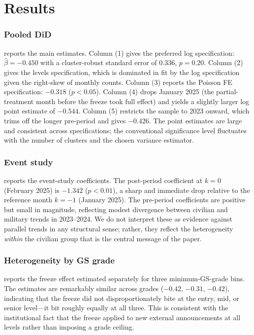 \documentclass[12pt]{article}
\begin{document}
\section{Results}
\label{sec:res}

\subsubsection*{Pooled DiD}  reports the main estimates. Column (1) gives the preferred log specification: $\hat\beta = -0.450$ with a cluster-robust standard error of $0.336$, $p = 0.20$. Column (2) gives the levels specification, which is dominated in fit by the log specification given the right-skew of monthly counts. Column (3) reports the Poisson FE specification: $-0.318$ ($p < 0.05$). Column (4) drops January 2025 (the partial-treatment month before the freeze took full effect) and yields a slightly larger log point estimate of $-0.544$. Column (5) restricts the sample to 2023 onward, which trims off the longer pre-period and gives $-0.426$. The point estimates are large and consistent across specifications; the conventional significance level fluctuates with the number of clusters and the chosen variance estimator.



\subsubsection*{Event study}  reports the event-study coefficients. The post-period coefficient at $k=0$ (February 2025) is $-1.342$ ($p < 0.01$), a sharp and immediate drop relative to the reference month $k = -1$ (January 2025). The pre-period coefficients are positive but small in magnitude, reflecting modest divergence between civilian and military trends in 2023--2024. We do not interpret these as evidence against parallel trends in any structural sense; rather, they reflect the heterogeneity \emph{within} the civilian group that is the central message of the paper.



\subsubsection*{Heterogeneity by GS grade}  reports the freeze effect estimated separately for three minimum-GS-grade bins. The estimates are remarkably similar across grades ($-0.42$, $-0.31$, $-0.42$), indicating that the freeze did not disproportionately bite at the entry, mid, or senior level---it bit roughly equally at all three. This is consistent with the institutional fact that the freeze applied to new external announcements at all levels rather than imposing a grade ceiling.
\end{document}
